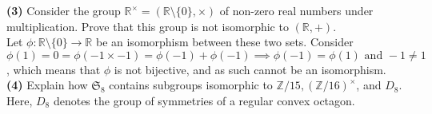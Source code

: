 \documentclass[12pt,letterpaper]{article}
\begin{document}
\textbf{(3)} Consider the group \(\mathbb{R}^{\times} = (\mathbb{R}\setminus \{0\}, \times)\) of non-zero real numbers under multiplication. Prove that this group is not isomorphic to \((\mathbb{R}, +)\). \\

Let \(\phi : \mathbb{R}\setminus \{0\} \to \mathbb{R}\) be an isomorphism between these two sets. Consider \(\phi(1) = 0 = \phi(-1 \times -1) = \phi(-1) + \phi(-1) \implies \phi(-1) = \phi(1) \text{ and } -1 \neq 1\), which means that \(\phi\) is not bijective, and as such cannot be an isomorphism. \\

\textbf{(4)} Explain how \(\mathfrak{S}_{8}\) contains subgroups isomorphic to \(\mathbb{Z}/15, (\mathbb{Z}/16)^{\times}\), and \(D_{8}\). Here, \(D_{8}\) denotes the group of symmetries of a regular convex octagon. \\ 
\end{document}
